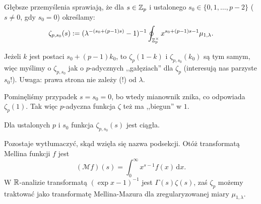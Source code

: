 Głębsze przemyślenia sprawiają, że dla $s \in \mathbb Z_p$ i ustalonego $s_0 \in \{0, 1, \dots, p-2\}$ ($s \neq 0$, gdy $s_0 = 0$) określamy:
\[
	\zeta_{p, s_0}(s) := (\lambda^{-(s_0 + (p-1)s)}-1)^{-1}\oint_{\mathbb Z_p^\times} x^{s_0 + (p-1)s-1} \mu_{1,\lambda}.
\]

Jeżeli $k$ jest postaci $s_0 + (p-1)k_0$, to $\zeta_p(1-k)$ i $\zeta_{p,s_0}(k_0)$ są tym samym, więc myślimy o $\zeta_{p, s_0}$ jak o $p$-adycznych ,,gałęziach'' dla $\zeta_p$ (interesują nas parzyste $s_0$!).
Uwaga: prawa strona nie zależy (!) od $\lambda$.

Pominęliśmy przypadek $s = s_0 = 0$, bo wtedy mianownik znika, co odpowiada $\zeta_p(1)$.
Tak więc $p$-adyczna funkcja $\zeta$ też ma ,,biegun'' w $1$.

\begin{fakt}
	Dla ustalonych $p$ i $s_0$ funkcja $\zeta_{p,s_0}(s)$ jest ciągła. %
\end{fakt}

Pozostaje wytłumaczyć, skąd wzięła się nazwa podsekcji.
Otóż transformatą Mellina funkcji $f$ jest
\[
	(\mathcal M f)(s) = \int_0^\infty x^{s-1} f(x)\,\textrm{d}x.
\]
W $\mathbb R$-analizie transformatą $(\exp x - 1)^{-1}$ jest $\Gamma(s) \zeta(s)$, zaś $\zeta_p$ możemy traktować jako transformatę Mellina-Mazura dla zregularyzowanej miary $\mu_{1, \lambda}$.
